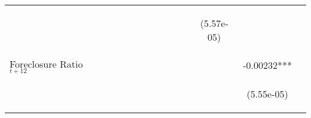 \begin{table}
\begin{center}
{\begin{tabular}{lccccccccccccc}
\vspace{4pt} & \begin{footnotesize}\end{footnotesize} & \begin{footnotesize}\end{footnotesize} & \begin{footnotesize}\end{footnotesize} & \begin{footnotesize}\end{footnotesize} & \begin{footnotesize}\end{footnotesize} & \begin{footnotesize}\end{footnotesize} & \begin{footnotesize}\end{footnotesize} & \begin{footnotesize}\end{footnotesize} & \begin{footnotesize}\end{footnotesize} & \begin{footnotesize}\end{footnotesize} & \begin{footnotesize}(5.57e-05)\end{footnotesize} & \begin{footnotesize}\end{footnotesize} \\
Foreclosure Ratio$_{t+12}$  &    &  &  &  &  &  &  &  &  &  &  & -0.00232*** \\
\vspace{4pt} & \begin{footnotesize}\end{footnotesize} & \begin{footnotesize}\end{footnotesize} & \begin{footnotesize}\end{footnotesize} & \begin{footnotesize}\end{footnotesize} & \begin{footnotesize}\end{footnotesize} & \begin{footnotesize}\end{footnotesize} & \begin{footnotesize}\end{footnotesize} & \begin{footnotesize}\end{footnotesize} & \begin{footnotesize}\end{footnotesize} & \begin{footnotesize}\end{footnotesize} & \begin{footnotesize}\end{footnotesize} & \begin{footnotesize}(5.55e-05)\end{footnotesize} \\

\end{tabular}}
\end{center}
\end{table}
